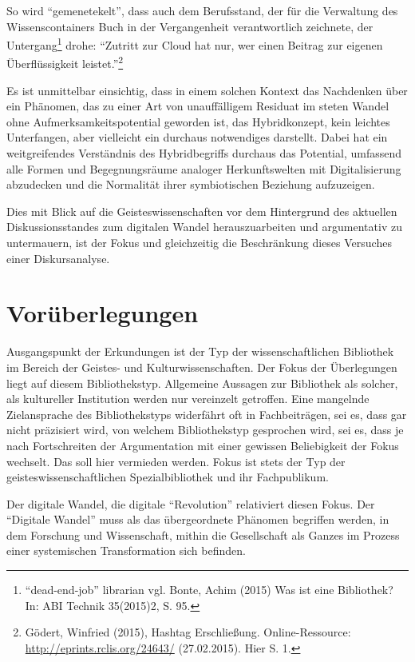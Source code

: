 \documentclass[a4paper,
fontsize=11pt,
oneside,
numbers=noperiodatend,
parskip=half-,
bibliography=totoc,
final
]{scrartcl}
\begin{document}
So wird \enquote{gemenetekelt}, dass auch dem Berufsstand, der für die
Verwaltung des Wissenscontainers Buch in der Vergangenheit
verantwortlich zeichnete, der Untergang\footnote{\enquote{dead-end-job}
  librarian vgl. Bonte, Achim (2015) Was ist eine Bibliothek? In: ABI
  Technik 35(2015)2, S. 95.} drohe: \enquote{Zutritt zur Cloud hat nur,
wer einen Beitrag zur eigenen Überflüssigkeit leistet.}\footnote{Gödert,
  Winfried (2015), Hashtag Erschließung. Online-Ressource:
  \url{http://eprints.rclis.org/24643/} (27.02.2015). Hier S. 1.}

Es ist unmittelbar einsichtig, dass in einem solchen Kontext das
Nachdenken über ein Phänomen, das zu einer Art von unauffälligem
Residuat im steten Wandel ohne Aufmerksamkeitspotential geworden ist,
das Hybridkonzept, kein leichtes Unterfangen, aber vielleicht ein
durchaus notwendiges darstellt. Dabei hat ein weitgreifendes Verständnis
des Hybridbegriffs durchaus das Potential, umfassend alle Formen und
Begegnungsräume analoger Herkunftswelten mit Digitalisierung abzudecken
und die Normalität ihrer symbiotischen Beziehung aufzuzeigen.

Dies mit Blick auf die Geisteswissenschaften vor dem Hintergrund des
aktuellen Diskussionsstandes zum digitalen Wandel herauszuarbeiten und
argumentativ zu untermauern, ist der Fokus und gleichzeitig die
Beschränkung dieses Versuches einer Diskursanalyse.

\section*{Vorüberlegungen}\label{voruxfcberlegungen}

Ausgangspunkt der Erkundungen ist der Typ der wissenschaftlichen
Bibliothek im Bereich der Geistes- und Kulturwissenschaften. Der Fokus
der Überlegungen liegt auf diesem Bibliothekstyp. Allgemeine Aussagen
zur Bibliothek als solcher, als kultureller Institution werden nur
vereinzelt getroffen. Eine mangelnde Zielansprache des Bibliothekstyps
widerfährt oft in Fachbeiträgen, sei es, dass gar nicht präzisiert wird,
von welchem Bibliothekstyp gesprochen wird, sei es, dass je nach
Fortschreiten der Argumentation mit einer gewissen Beliebigkeit der
Fokus wechselt. Das soll hier vermieden werden. Fokus ist stets der Typ
der geisteswissenschaftlichen Spezialbibliothek und ihr Fachpublikum.

Der digitale Wandel, die digitale \enquote{Revolution} relativiert
diesen Fokus. Der \enquote{Digitale Wandel} muss als das übergeordnete
Phänomen begriffen werden, in dem Forschung und Wissenschaft, mithin die
Gesellschaft als Ganzes im Prozess einer systemischen Transformation
sich befinden.
\end{document}
